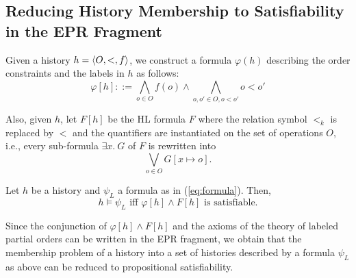 
\subsection{Reducing History Membership to Satisfiability in the EPR Fragment}

Given a history $h=\left\langle {O,<,f} \right\rangle$, we construct a formula $\varphi(h)$ describing the order constraints
and the labels in $h$ as follows:
\[
\varphi[h]::= \bigwedge_{o\in O} f(o)\land \bigwedge_{o,o'\in O, o<o'} o< o'
\]

Also, given $h$, let $F[h]$ be the HL formula $F$ where the relation symbol $<_k$ is replaced by $<$
and the quantifiers are instantiated on the set of operations $O$, 
i.e., every sub-formula $\exists x.\ G$ of $F$ is rewritten into
\[
\bigvee_{o\in O} G[x\mapsto o].
\]

\begin{theorem}
Let $h$ be a history and $\psi_L$ a formula as in (\ref{eq:formula}). Then,
\[
h\models \psi_L\mbox{ iff }\varphi[h]\land F[h]\mbox{ is satisfiable.}
\]
\end{theorem}

Since the conjunction of $\varphi[h]\land F[h]$ and the axioms of the theory of 
labeled partial orders can be written in the EPR fragment, we obtain that the
membership problem of a history into a set of histories described by a formula $\psi_L$ as above
can be reduced to propositional satisfiability.